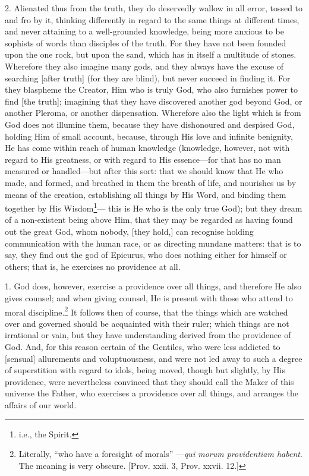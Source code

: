 2. Alienated thus from the truth, they do deservedly wallow in all error, tossed to and fro by it, thinking differently in regard to the same things at different times, and never attaining to a well-grounded knowledge, being more anxious to be sophists of words than disciples of the truth. For they have not been founded upon the one rock, but upon the sand, which has in itself a multitude of stones. Wherefore they also imagine many gods, and they always have the excuse of searching [after truth] (for they are blind), but never succeed in finding it. For they blaspheme the Creator, Him who is truly God, who also furnishes power to find [the truth]; imagining that they have discovered another god beyond God, or another Pleroma, or another dispensation. Wherefore also the light which is from God does not illumine them, because they have dishonoured and despised God, holding Him of small account, because, through His love and infinite benignity, He has come within reach of human knowledge (knowledge, however, not with regard to His greatness, or with regard to His essence—for that has no  man measured or handled—but after this sort: that we should know that He who made, and formed, and breathed in them the breath of life, and nourishes us by means of the creation, establishing all things by His Word, and binding them together by His Wisdom\footnote{i.e., the Spirit.}— this is He who is the only true God); but they dream of a non-existent being above Him, that they may be regarded as having found out the great God, whom nobody, [they hold,] can recognise holding communication with the human race, or as directing mundane matters: that is to say, they find out the god of Epicurus, who does nothing either for himself or others; that is, he exercises no providence at all.


1. God does, however, exercise a providence over all things, and therefore He also gives counsel; and when giving counsel, He is present with those who attend to moral discipline.\footnote{Literally, “who have a foresight of morals” —\emph{qui morum providentiam habent}. The meaning is very obscure. [Prov. xxii. 3, Prov. xxvii. 12.]} It follows then of course, that the things which are watched over and governed should be acquainted with their ruler; which things are not irrational or vain, but they have understanding derived from the providence of God. And, for this reason certain of the Gentiles, who were less addicted to [sensual] allurements and voluptuousness, and were not led away to such a degree of superstition with regard to idols, being moved, though but slightly, by His providence, were nevertheless convinced that they should call the Maker of this universe the Father, who exercises a providence over all things, and arranges the affairs of our world.


